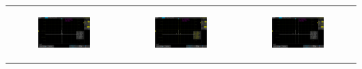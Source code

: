 \documentclass[a4paper,12pt]{article} %
\begin{document}
\begin{table}[ht]
\begin{tabular}{ccc}
\newline
\begin{subfigure}{0.3\textwidth}\centering\includegraphics[width=\columnwidth]{III/AKIP0022.png}\end{subfigure} &
\begin{subfigure}{0.3\textwidth}\centering\includegraphics[width=\columnwidth]{III/AKIP0023.png}\end{subfigure} &
\begin{subfigure}{0.3\textwidth}\centering\includegraphics[width=\columnwidth]{III/AKIP0024.png}\end{subfigure} \\

\end{tabular}
\end{table}
\end{document}
